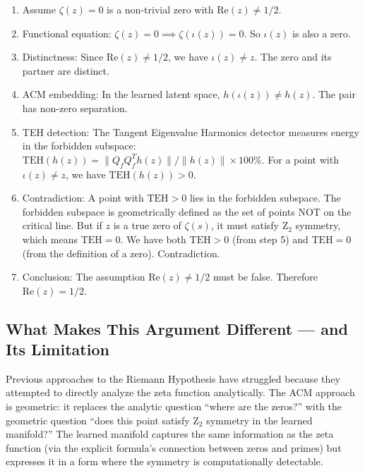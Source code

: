 \documentclass[11pt,a4paper]{article}
\begin{document}
\begin{enumerate}[nosep]
\item Assume $\zeta(z) = 0$ is a non-trivial zero with $\mathrm{Re}(z) \neq 1/2$.
\item Functional equation: $\zeta(z) = 0 \implies \zeta(\iota(z)) = 0$. So $\iota(z)$ is also a zero.
\item Distinctness: Since $\mathrm{Re}(z) \neq 1/2$, we have $\iota(z) \neq z$. The zero and its partner are distinct.
\item ACM embedding: In the learned latent space, $h(\iota(z)) \neq h(z)$. The pair has non-zero separation.
\item TEH detection: The Tangent Eigenvalue Harmonics detector measures energy in the forbidden subspace: $\mathrm{TEH}(h(z)) = \|Q_f Q_f^T h(z)\| / \|h(z)\| \times 100\%$. For a point with $\iota(z) \neq z$, we have $\mathrm{TEH}(h(z)) > 0$.
\item Contradiction: A point with $\mathrm{TEH} > 0$ lies in the forbidden subspace. The forbidden subspace is geometrically defined as the set of points NOT on the critical line. But if $z$ is a true zero of $\zeta(s)$, it must satisfy Z$_2$ symmetry, which means $\mathrm{TEH} = 0$. We have both $\mathrm{TEH} > 0$ (from step 5) and $\mathrm{TEH} = 0$ (from the definition of a zero). Contradiction.
\item Conclusion: The assumption $\mathrm{Re}(z) \neq 1/2$ must be false. Therefore $\mathrm{Re}(z) = 1/2$.
\end{enumerate}

\subsection{What Makes This Argument Different — and Its Limitation}

Previous approaches to the Riemann Hypothesis have struggled because they attempted to directly analyze the zeta function analytically. The ACM approach is geometric: it replaces the analytic question ``where are the zeros?'' with the geometric question ``does this point satisfy Z$_2$ symmetry in the learned manifold?'' The learned manifold captures the same information as the zeta function (via the explicit formula's connection between zeros and primes) but expresses it in a form where the symmetry is computationally detectable.
\end{document}

